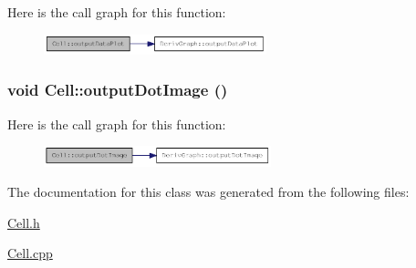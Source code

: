 Here is the call graph for this function:\nopagebreak
\begin{figure}[H]
\begin{center}
\leavevmode
\includegraphics[width=183pt]{classCell_a8e117526c56dda4d0d56d840d1558835_cgraph}
\end{center}
\end{figure}
\hypertarget{classCell_a535ddddc0471fa874a0b22a54bd38c1a}{
\subsubsection[{outputDotImage}]{\setlength{\rightskip}{0pt plus 5cm}void Cell::outputDotImage ()}}
\label{classCell_a535ddddc0471fa874a0b22a54bd38c1a}


Here is the call graph for this function:\nopagebreak
\begin{figure}[H]
\begin{center}
\leavevmode
\includegraphics[width=187pt]{classCell_a535ddddc0471fa874a0b22a54bd38c1a_cgraph}
\end{center}
\end{figure}


The documentation for this class was generated from the following files:\begin{DoxyCompactItemize}
\item 
\hyperlink{Cell_8h}{Cell.h}\item 
\hyperlink{Cell_8cpp}{Cell.cpp}\end{DoxyCompactItemize}
